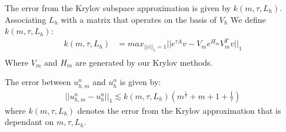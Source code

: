 \begin{definition}
    The error from the Krylov subspace approximation is given by $k(m,\tau, L_h)$.
    Associating $L_h$ with a matrix that operates on the basis of $V_h$
    We define $k(m,\tau, L_h)$:
    \begin{align*}
        k(m,\tau, L_h) &= max_{||v||_1=1}||e^{\tau A}v - V_m e^{H_m}V^T_mv||_1\\
    \end{align*}
    Where $V_m$ and $H_m$ are generated by our Krylov methods.
\end{definition}
\begin{lemma}\label{lemma:krylovbound}
    The error between $u_{h,m}^n$ and $u_{h}^n$ is given by:
    \begin{align*}
        ||u_{h,m}^n - u_{h}^n||_1 \lesssim k(m,\tau, L_h)(m^\frac{1}{\tau} + m + 1 + \frac{1}{\tau})
    \end{align*}
    where $k(m,\tau,L_h)$ denotes the error from the Krylov approximation that is dependant on $m, \tau, L_h$.
\end{lemma}
